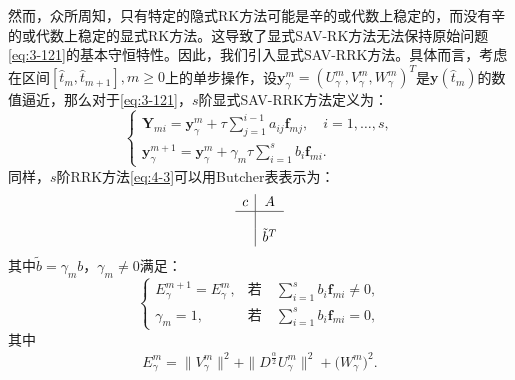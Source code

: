	然而，众所周知，只有特定的隐式RK方法可能是辛的或代数上稳定的，而没有辛的或代数上稳定的显式RK方法。这导致了显式SAV-RK方法无法保持原始问题\eqref{eq:3-121}的基本守恒特性。因此，我们引入显式SAV-RRK方法。具体而言，考虑在区间$\left[\hat{t}_m, \hat{t}_{m+1}\right], m \geq 0$上的单步操作，设$\bm{y}_\gamma^m=\left(U^{m}_{\gamma},V^{m}_{\gamma},W^{m}_{\gamma}\right)^T$是$\bm{y}\left(\hat{t}_m\right)$的数值逼近，那么对于\eqref{eq:3-121}，$s$阶显式SAV-RRK方法定义为：
	\begin{equation}
	\left\{\begin{array}{l}
	\bm{Y}_{m i}=\bm{y}_\gamma^m+\tau \sum\limits_{j=1}^{i-1} a_{i j} \bm{f}_{m j}, \quad i=1, \ldots, s, \\
	\bm{y}_\gamma^{m+1}=\bm{y}_\gamma^m+\gamma_m \tau \sum\limits_{i=1}^s b_i \bm{f}_{m i}.
	\end{array}\right.\label{eq:4-3}
	\end{equation}
	同样，$s$阶RRK方法\eqref{eq:4-3}可以用Butcher表表示为：
	\begin{equation}
	\begin{array}{c|c}
	c & A \\
	\hline \\
	& \tilde{b}^T
	\end{array}
	\end{equation}
	其中$\tilde{b}=\gamma_m b$，$\gamma_m\neq 0$满足：
	\begin{equation}
	\left\{\begin{array}{ll}
	E_{\gamma}^{m+1}=E_{\gamma}^{m}, & \text{若} \quad  \sum\limits_{i=1}^s b_i \bm{f}_{m i} \neq 0,\\
	\gamma_m=1, & \text{若} \quad  \sum\limits_{i=1}^s b_i \bm{f}_{m i} =0,
	\end{array}\right.\label{eq:4-6}
	\end{equation}
	其中
	\begin{align}\label{eq:4-6b}
	E_{\gamma}^{m}  =\|V_{\gamma}^{m}\|^2+\|D^\frac{\alpha}{2} U_{\gamma}^{m}\|^2+\big(W_{\gamma}^{m}\big)^2.
	\end{align}

